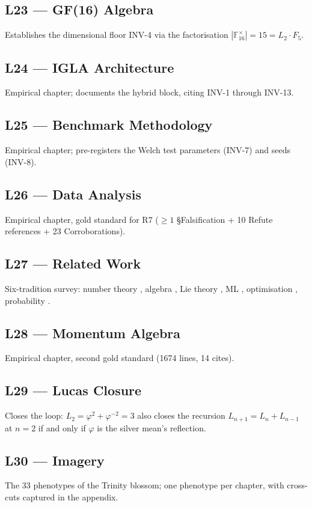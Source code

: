 \subsection*{L23 — GF(16) Algebra} Establishes the dimensional floor
INV-4 via the factorisation $|\mathbb{F}_{16}^{\times}|=15=L_{2}\cdot F_{5}$.

\subsection*{L24 — IGLA Architecture} Empirical chapter; documents the
hybrid block, citing INV-1 through INV-13.

\subsection*{L25 — Benchmark Methodology} Empirical chapter; pre-registers
the Welch test parameters (INV-7) and seeds (INV-8).

\subsection*{L26 — Data Analysis} Empirical chapter, gold standard for R7
($\geq 1$ §Falsification + 10 Refute references + 23 Corroborations).

\subsection*{L27 — Related Work} Six-tradition survey: number theory
\cite{lang_algebra}, algebra \cite{atiyah_macdonald}, Lie theory
\cite{humphreys}, ML \cite{bishop, esl}, optimisation
\cite{nesterov_convex_opt}, probability \cite{durrett}.

\subsection*{L28 — Momentum Algebra} Empirical chapter, second gold
standard (1674 lines, 14 cites).

\subsection*{L29 — Lucas Closure} Closes the loop:
$L_{2}=\varphi^{2}+\varphi^{-2}=3$ also closes the recursion
$L_{n+1}=L_{n}+L_{n-1}$ at $n=2$ if and only if $\varphi$ is the silver
mean's reflection.

\subsection*{L30 — Imagery} The 33 phenotypes of the Trinity blossom; one
phenotype per chapter, with cross-cuts captured in the appendix.

